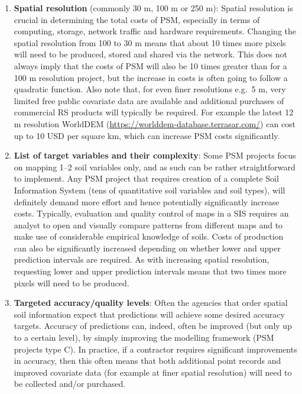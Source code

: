 \documentclass[graybox,natbib,nospthms,UStrade]{svmono}
\begin{document}
\begin{enumerate}
\def\labelenumi{\arabic{enumi}.}
\item
  \textbf{Spatial resolution} (commonly 30 m, 100 m or 250 m): Spatial
  resolution is crucial in determining the total costs of PSM,
  especially in terms of computing, storage, network traffic and
  hardware requirements. Changing the spatial resolution from 100 to
  30 m means that about 10 times more pixels will need to be
  produced, stored and shared via the network. This does not always
  imply that the costs of PSM will also be 10 times greater than for
  a 100 m resolution project, but the increase in costs is often
  going to follow a quadratic function. Also note that, for even
  finer resolutions e.g.~5 m, very limited free public covariate
  data are available and additional purchases of commercial RS
  products will typically be required. For example the latest 12 m
  resolution WorldDEM (\url{https://worlddem-database.terrasar.com/}) can cost
  up to 10 USD per square km, which can increase PSM costs significantly.
\item
  \textbf{List of target variables and their complexity}: Some PSM projects
  focus on mapping 1--2 soil variables only, and as such can be
  rather straightforward to implement. Any PSM project that requires
  creation of a complete Soil Information System (tens of
  quantitative soil variables and soil types), will definitely
  demand more effort and hence potentially significantly
  increase costs. Typically, evaluation and quality control of maps
  in a SIS requires an analyst to open and visually compare patterns
  from different maps and to make use of considerable empirical
  knowledge of soils. Costs of production can also be significantly
  increased depending on whether lower and upper prediction
  intervals are required. As with increasing spatial resolution,
  requesting lower and upper prediction intervals means that two
  times more pixels will need to be produced.
\item
  \textbf{Targeted accuracy/quality levels}: Often the agencies that order
  spatial soil information expect that predictions will achieve some
  desired accuracy targets. Accuracy of predictions can, indeed,
  often be improved (but only up to a certain level), by simply
  improving the modelling framework (PSM projects type C). In
  practice, if a contractor requires significant improvements in
  accuracy, then this often means that both additional point records
  and improved covariate data (for example at finer
  spatial resolution) will need to be collected and/or purchased.

\end{enumerate}
\end{document}
